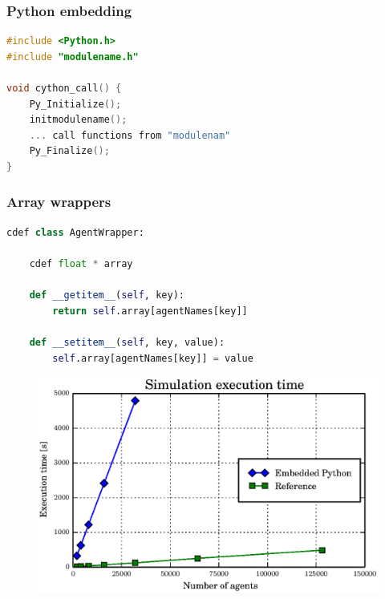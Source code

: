 \documentclass[t]{beamer}
\begin{document}
\begin{frame}[fragile,c]

\frametitle{\huge Python embedding}
\begin{lstlisting}[language=c]
#include <Python.h>
#include "modulename.h"

void cython_call() {
    Py_Initialize();
    initmodulename();
    ... call functions from "modulenam"
    Py_Finalize();
}
\end{lstlisting}

\end{frame}

\begin{frame}[fragile,c]

\frametitle{\huge Array wrappers}
\begin{lstlisting}[language=python]
cdef class AgentWrapper:

    cdef float * array

    def __getitem__(self, key):
        return self.array[agentNames[key]]

    def __setitem__(self, key, value):
        self.array[agentNames[key]] = value
\end{lstlisting}
\end{frame}


\begin{frame}[c]

\begin{figure}[ht!]
  \begin{center}
    \includegraphics[width=\columnwidth]{graphs/cython-perf.eps}
  \end{center}
\end{figure}

\end{frame}
\end{document}
